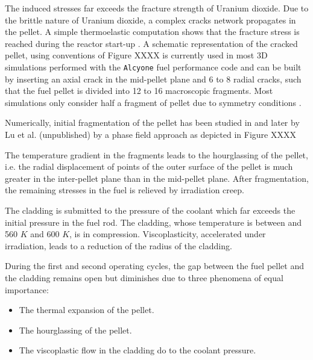 
The induced stresses far exceeds the fracture strength of Uranium
dioxide. Due to the brittle nature of Uranium dioxide, a complex cracks
network propagates in the pellet. A simple thermoelastic computation
shows that the fracture stress is reached during the reactor start-up
\cite{helfer_etude_2006}. A schematic representation of the cracked pellet,
using conventions of Figure XXXX is currently used in
most 3D simulations performed with the \texttt{Alcyone} fuel performance
code and can be built by inserting an axial crack in the mid-pellet
plane and 6 to 8 radial cracks, such that the fuel pellet is
divided into 12 to 16 macroscopic fragments. Most simulations
only consider half a fragment of pellet due to symmetry conditions
\cite{michel_pellet_2005}.

Numerically, initial fragmentation of the pellet has been studied in
\cite{helfer_modelisation_2017} and later by Lu et al. (unpublished) by a
phase field approach as depicted in Figure
XXXX

The temperature gradient in the fragments leads to the hourglassing of
the pellet, i.e. the radial displacement of points of the outer surface
of the pellet is much greater in the inter-pellet plane than in the
mid-pellet plane. After fragmentation, the remaining stresses in the
fuel is relieved by irradiation creep.

The cladding is submitted to the pressure of the coolant which far
exceeds the initial pressure in the fuel rod. The cladding, whose
temperature is between and 560 $K$ and 600 $K$, is in compression.
Viscoplasticity, accelerated under irradiation, leads to a reduction of
the radius of the cladding.

During the first and second operating cycles, the gap between the fuel
pellet and the cladding remains open but diminishes due to three
phenomena of equal importance:

\begin{itemize}
    \item The thermal expansion of the pellet.
    \item The hourglassing of the pellet.
    \item The viscoplastic flow in the cladding do to the coolant pressure.
\end{itemize}

